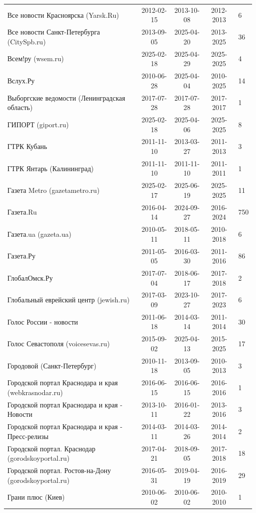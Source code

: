\begin{longtable}{p{6cm}cccp{2cm}}
Все новости Красноярска (Yarsk.Ru) & 2012-02-15 & 2013-10-08 & 2012-2013 & 6\\
Все новости Санкт-Петербурга (CitySpb.ru) & 2013-09-05 & 2025-04-20 & 2013-2025 & 36\\
Всем!ру (wsem.ru) & 2025-02-18 & 2025-04-29 & 2025-2025 & 4\\
Вслух.Ру & 2010-06-28 & 2025-04-04 & 2010-2025 & 14\\
Выборгские ведомости (Ленинградская область) & 2017-07-28 & 2017-07-28 & 2017-2017 & 1\\
ГИПОРТ (giport.ru) & 2025-02-18 & 2025-04-06 & 2025-2025 & 8\\
ГТРК Кубань & 2011-11-10 & 2013-03-27 & 2011-2013 & 3\\
ГТРК Янтарь (Калининград) & 2011-11-10 & 2011-11-10 & 2011-2011 & 1\\
Газета Metro (gazetametro.ru) & 2025-02-17 & 2025-06-19 & 2025-2025 & 11\\
Газета.Ru & 2016-04-14 & 2024-09-27 & 2016-2024 & 750\\
Газета.ua (gazeta.ua) & 2010-05-11 & 2018-05-11 & 2010-2018 & 6\\
Газета.Ру & 2011-05-05 & 2016-03-30 & 2011-2016 & 86\\
ГлобалОмск.Ру & 2017-07-04 & 2018-06-17 & 2017-2018 & 2\\
Глобальный еврейский центр (jewish.ru) & 2017-03-09 & 2023-10-27 & 2017-2023 & 6\\
Голос России - новости & 2011-06-18 & 2014-03-14 & 2011-2014 & 30\\
Голос Севастополя (voicesevas.ru) & 2015-09-02 & 2025-04-13 & 2015-2025 & 17\\
Городовой (Санкт-Петербург) & 2010-11-18 & 2013-09-05 & 2010-2013 & 3\\
Городской портал Краснодара и края (webkrasnodar.ru) & 2016-06-15 & 2016-06-15 & 2016-2016 & 1\\
Городской портал Краснодара и края - Новости & 2013-10-11 & 2016-01-22 & 2013-2016 & 3\\
Городской портал Краснодара и края - Пресс-релизы & 2014-03-11 & 2014-03-26 & 2014-2014 & 2\\
Городской портал. Краснодар (gorodskoyportal.ru) & 2017-04-21 & 2018-09-05 & 2017-2018 & 18\\
Городской портал. Ростов-на-Дону (gorodskoyportal.ru) & 2016-05-31 & 2019-04-19 & 2016-2019 & 29\\
Грани плюс (Киев) & 2010-06-02 & 2010-06-02 & 2010-2010 & 1\\

\end{longtable}
